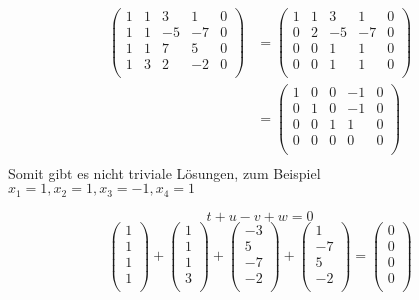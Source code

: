 \documentclass{article}
\begin{document}
\begin{enumerate}[i]
  \begin{align*}
    \left(
    \begin{array}{cccc|c}
      1 & 1 & 3  & 1  & 0 \\
      1 & 1 & -5 & -7 & 0 \\
      1 & 1 & 7  & 5  & 0 \\
      1 & 3 & 2  & -2 & 0 \\
    \end{array}
    \right)
    &=
    \left(
    \begin{array}{cccc|c}
      1 & 1 & 3  & 1  & 0 \\
      0 & 2 & -5 & -7 & 0 \\
      0 & 0 & 1  & 1  & 0 \\
      0 & 0 & 1  & 1  & 0 \\
    \end{array}
    \right) \\    
    &=
    \left(
    \begin{array}{cccc|c}
      1 & 0 & 0 & -1 & 0 \\
      0 & 1 & 0 & -1 & 0 \\
      0 & 0 & 1 & 1  & 0 \\
      0 & 0 & 0 & 0  & 0 \\
    \end{array}
    \right) \\
  \end{align*}
  Somit gibt es nicht triviale Lösungen, zum Beispiel $x_1 = 1, x_2 = 1, x_3 = -1, x_4 = 1$

  \[
    t + u - v + w = 0
  \]
  \[
    \begin{pmatrix}
      1 \\
      1 \\
      1 \\
      1 \\
    \end{pmatrix}
    +
    \begin{pmatrix}
      1 \\
      1 \\
      1 \\
      3 \\
    \end{pmatrix}
    +
    \begin{pmatrix}
      -3 \\
      5  \\
      -7 \\
      -2 \\
    \end{pmatrix}
    + \begin{pmatrix}
      1  \\
      -7 \\
      5  \\
      -2 \\
    \end{pmatrix}
    =
    \begin{pmatrix}
      0 \\
      0 \\
      0 \\
      0 \\
    \end{pmatrix}
  \]


\end{enumerate}
\end{document}
